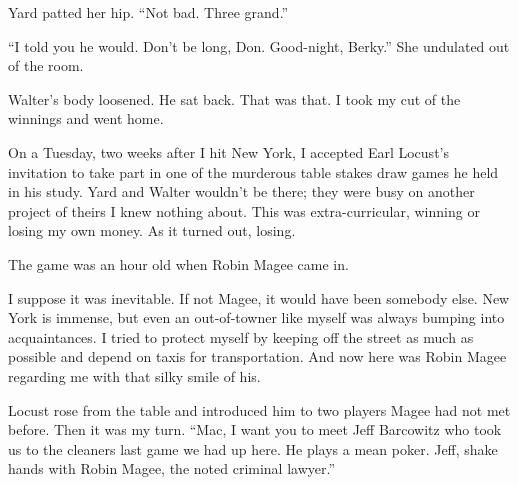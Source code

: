 \documentclass{novel}
\begin{document}
Yard patted her hip. “Not bad. Three grand.”

“I told you he would. Don’t be long, Don. Good-night, Berky.” She undulated out of the room.

Walter’s body loosened. He sat back. That was that. I took my cut of the winnings and went home.

\vspace{2\nbs}
\clearpage
\thispagestyle{empty}


\begin{ChapterStart}
\vspace{3\nbs}
\end{ChapterStart}

On a Tuesday, two weeks after I hit New York, I accepted Earl Locust’s invitation to take part in one of the murderous table stakes draw games he held in his study. Yard and Walter wouldn’t be there; they were busy on another project of theirs I knew nothing about. This was extra-curricular, winning or losing my own money. As it turned out, losing.

The game was an hour old when Robin Magee came in.

I suppose it was inevitable. If not Magee, it would have been somebody else. New York is immense, but even an out-of-towner like myself was always bumping into acquaintances. I tried to protect myself by keeping off the street as much as possible and depend on taxis for transportation. And now here was Robin Magee regarding me with that silky smile of his.

Locust rose from the table and introduced him to two players Magee had not met before. Then it was my turn. “Mac, I want you to meet Jeff Barcowitz who took us to the cleaners last game we had up here. He plays a mean poker. Jeff, shake hands with Robin Magee, the noted criminal lawyer.”
\end{document}
